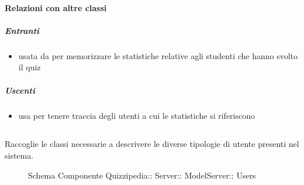 \paragraph{Relazioni con altre classi}
\subparagraph{Entranti}
\begin{itemize}
\item usata da  per memorizzare le statistiche relative agli studenti che hanno svolto il quiz
\end{itemize}
\subparagraph{Uscenti}
\begin{itemize}
\item usa  per tenere traccia degli utenti a cui le statistiche si riferiscono
\end{itemize}
\subsection{}
Raccoglie le classi necessarie a descrivere le diverse tipologie di utente presenti nel sistema.
\begin{figure}[H]
\centering
\noindent{}
\caption[Schema Componente Users]{Schema Componente Quizzipedia:: Server:: ModelServer:: Users}
\end{figure}
